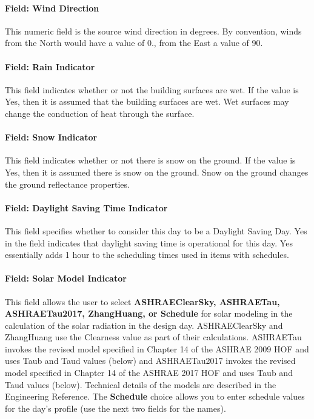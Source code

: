 \paragraph{Field: Wind Direction}\label{field-wind-direction}

This numeric field is the source wind direction in degrees. By convention, winds from the North would have a value of 0., from the East a value of 90.

\paragraph{Field: Rain Indicator}\label{field-rain-indicator}

This field indicates whether or not the building surfaces are wet. If the value is Yes, then it is assumed that the building surfaces are wet. Wet surfaces may change the conduction of heat through the surface.

\paragraph{Field: Snow Indicator}\label{field-snow-indicator}

This field indicates whether or not there is snow on the ground. If the value is Yes, then it is assumed there is snow on the ground. Snow on the ground changes the ground reflectance properties.

\paragraph{Field: Daylight Saving Time Indicator}\label{field-daylight-saving-time-indicator}

This field specifies whether to consider this day to be a Daylight Saving Day. Yes in the field indicates that daylight saving time is operational for this day. Yes essentially adds 1 hour to the scheduling times used in items with schedules.

\paragraph{Field: Solar Model Indicator}\label{field-solar-model-indicator}

This field allows the user to select \textbf{ASHRAE\-Clear\-Sky, ASHRAE\-Tau, ASHRAE\-Tau2017, Zhang\-Huang, or Sche\-dule} for solar modeling in the calculation of the solar radiation in the design day. ASHRAE\-Clear\-Sky and Zhang\-Huang use the Clearness value as part of their calculations. ASHRAE\-Tau invokes the revised model specified in Chapter 14 of the ASHRAE 2009 HOF and uses Taub and Taud values (below) and ASHRAE\-Tau2017 invokes the revised model specified in Chapter 14 of the ASHRAE 2017 HOF and uses Taub and Taud values (below). Technical details of the models are described in the Engineering Reference. The \textbf{Schedule} choice allows you to enter schedule values for the day's profile (use the next two fields for the names).

